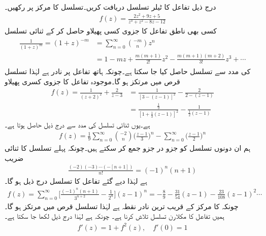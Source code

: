 \quad {}\\
درج ذیل تفاعل کا ٹیلر تسلسل دریافت کریں۔تسلسل کا مرکز  پر رکھیں۔
\begin{align*}
f(z)=\frac{2z^2+9z+5}{z^3+z^2-8z-12}
\end{align*}
کسی بھی ناطق تفاعل کا جزوی کسی پھیلاو حاصل کر کے ثنائی تسلسل
\begin{gather}
\begin{aligned}\label{مساوات_ٹیلر_عملی_تراکیب_ب}
\frac{1}{(1+z)^m}=(1+z)^{-m}&=\sum\limits_{n=0}^{\infty} \binom{-m}{n} z^n\\
&=1-mz+\frac{m(m+1)}{2!}z^2-\frac{m(m+1)(m+2)}{3!}z^3+\cdots
\end{aligned}
\end{gather} 
کی مدد سے تسلسل حاصل کیا جا سکتا ہے۔چونکہ ہاتھ تفاعل  پر نادر ہے لہٰذا تسلسل قرص  میں مرتکز ہو گا۔موجودہ تفاعل کا جزوی کسری پھیلاو
\begin{align*}
f(z)=\frac{1}{(z+2)^2}+\frac{2}{z-3}&=\frac{1}{[3-(z-1)]^2}-\frac{2}{2-(z-1)}\\
&=\frac{\frac{1}{9}}{[1+\frac{1}{3}(z-1)]^2}-\frac{1}{\frac{1}{2}(z-1)}
\end{align*}
ہے۔یوں ثنائی تسلسل کی مدد سے درج ذیل حاصل ہوتا ہے۔
\begin{align*}
f(z)=\frac{1}{9}\sum\limits_{n=0}^{\infty} \binom{-2}{n} \big(\frac{z-1}{3}\big)^n-\sum\limits_{n=0}^{\infty}\big(\frac{z-1}{2}\big)^n
\end{align*} 
ہم ان دونوں تسلسل کو جزو در جزو جمع کر سکتے ہیں۔چونکہ پہلے تسلسل کا ثنائی  ضریب  
\begin{align*}
\tfrac{(-2)(-3)\cdots(-[n+1])}{n!}=(-1)^n(n+1)
\end{align*}
ہے لہٰذا دیے گئے تفاعل کا تسلسل درج ذیل ہو گا۔
\begin{align*}
f(z)=\sum\limits_{n=0}^{\infty}\big[\frac{(-1)^n(n+1)}{3^{n+2}}-\frac{1}{2^n}\big](z-1)^n=-\frac{8}{9}-\frac{31}{54}(z-1)-\frac{23}{108}(z-1)^2\cdots
\end{align*}
چونکہ   کا  مرکز  کے قریب ترین نادر نقطہ  ہے لہٰذا تسلسل قرص  میں مرتکز ہو گا۔
\quad {}\\
ہمیں تفاعل  کا مکلارن تسلسل تلاش کرنا ہے۔ چونکہ  ہے لہٰذا درج ذیل لکھا جا سکتا ہے۔
\begin{align*}
f'(z)=1+f^2(z),\quad f'(0)=1
\end{align*}
